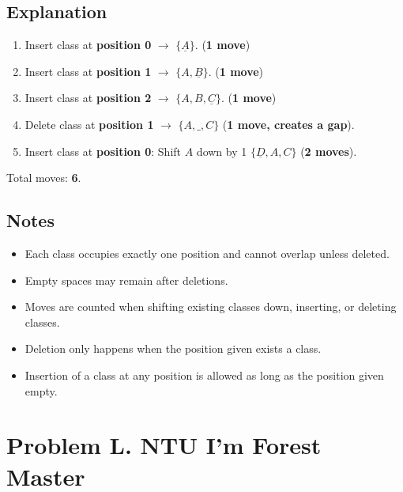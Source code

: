 \documentclass[12pt,a4paper]{article}
\begin{document}
\subsection*{\fontsize{16}{12}Explanation}
\begin{enumerate}
    \item Insert class at \textbf{position 0} $\rightarrow$ \(\{\underline{A}\}\). (\textbf{1 move})
    \item Insert class at \textbf{position 1} $\rightarrow$ \(\{A, \underline{B}\}\). (\textbf{1 move})
    \item Insert class at \textbf{position 2} $\rightarrow$ \(\{A, B, \underline{C}\}\). (\textbf{1 move})
    \item Delete class at \textbf{position 1} $\rightarrow$ \(\{A, \_, C\}\) (\textbf{1 move, creates a gap}).
    \item Insert class at \textbf{position 0}: Shift \( A \) down by 1 \(\{\underline{D}, A, C\}\) (\textbf{2 moves}).
\end{enumerate}
Total moves: \textbf{6}.

\subsection*{\fontsize{16}{12}Notes}
\begin{itemize}
    \item Each class occupies exactly one position and cannot overlap unless deleted.
    \item Empty spaces may remain after deletions.
    \item Moves are counted when shifting existing classes down, inserting, or deleting classes.
    \item Deletion only happens when the position given exists a class.
    \item Insertion of a class at any position is allowed as long as the position given empty.
\end{itemize}

\newpage
\section*{\fontsize{18}{12}Problem L. NTU I'm Forest Master}
\end{document}
